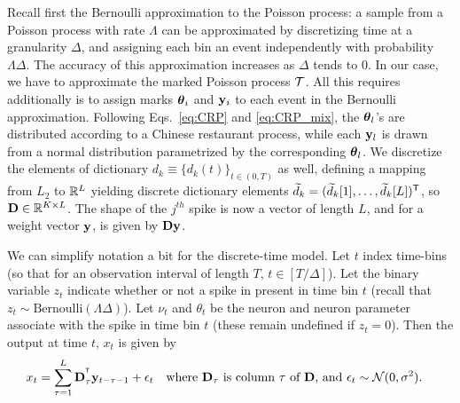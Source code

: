 Recall first the Bernoulli approximation to the Poisson process: a sample from a Poisson process with rate $\Lambda$ can be approximated by discretizing
time at a granularity $\Delta$, and assigning each bin an event independently with probability $\Lambda\Delta$. The accuracy of this approximation increases 
as $\Delta$ tends to $0$.
%
In our case, we have to approximate the marked Poisson process $\mathcal{T}$. All this requires additionally is to assign marks $\boldsymbol{\theta}_i$ and $\mathbf{y}_i$ to each event 
in the Bernoulli approximation. Following Eqs.~\eqref{eq:CRP} and \eqref{eq:CRP_mix}, the $\boldsymbol{\theta}_l$'s are distributed according
to a Chinese restaurant process, while each $\mathbf{y}_l$ is drawn from a normal distribution parametrized by the corresponding $\boldsymbol{\theta}_l$. We discretize the 
elements of dictionary $d_k \equiv \{d_k(t)\}_{t \in (0,T)}$ as well, defining a mapping from $L_2$ to $\mathbb{R}^L$ yielding discrete dictionary elements $\widetilde{d}_k=(\widetilde{d}_k[1], \ldots, \widetilde{d}_k[L])^{\mathsf{T}}$,  so  $\mathbf{D} \in \mathbb{R}^{K \times L}$. The shape of the $j^{th}$ spike is now a vector of length $L$, and for a weight vector
$\mathbf{y}$, is given by $\mathbf{D} \mathbf{y}$.

We can simplify notation a bit for the discrete-time model. Let $t$ index time-bins (so that for an observation interval of length $T$, $t \in [T/\Delta]$).
Let the binary variable $z_t$ indicate whether or not a spike in present in time bin $t$ (recall that $z_t \sim \text{Bernoulli}(\Lambda \Delta)$). Let
$\nu_t$ and $\theta_t$ be the neuron and neuron parameter associate with the spike in time bin $t$ (these remain undefined if $z_t = 0$).
Then the output at time $t$, $x_t$ is given by
\begin{align}
  x_t = \sum_{\tau = 1}^L \mathbf{D}_{\tau}^{^{\mathsf{T}}} \mathbf{y}_{t-\tau-1} + \epsilon_t &\text{\quad where $\mathbf{D}_{\tau}$ is column $\tau$ of $\mathbf{D}$, 
  and $\epsilon_t \sim \mathcal{N}(0,\sigma^2)$.} 
\end{align}
